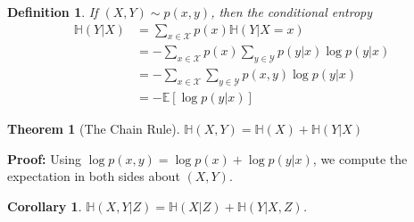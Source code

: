 \documentclass[11pt]{article}
\newtheorem{theorem}{Theorem}[section]
\newtheorem{definition}{Definition}[section]
\newtheorem{corollary}{Corollary}[section]
\begin{document}
\begin{definition}
If $(X,Y)\sim p(x,y)$, then the conditional entropy
\[
\begin{split}
\mathbb{H}(Y|X) &= \sum\limits_{x \in \mathcal{X}}p(x)\mathbb{H}(Y|X=x) \\
                &=-\sum\limits_{x \in \mathcal{X}}p(x)\sum\limits_{y \in \mathcal{Y}}p(y|x)\log p(y|x)\\
                &=-\sum\limits_{x \in \mathcal{X}}\sum\limits_{y \in \mathcal{Y}}p(x,y)\log p(y|x)\\
                &=-\mathbb{E}\left[\log p(y|x)\right]
\end{split}
\]
\end{definition}
\begin{theorem}[The Chain Rule]
$\mathbb{H}(X,Y)=\mathbb{H}(X)+\mathbb{H}(Y|X)$
\end{theorem}
{\bf Proof:}
Using $\log p(x,y)=\log p(x) + \log p(y|x)$, we compute the expectation in both sides about $(X,Y)$.

\begin{corollary}
$\mathbb{H}(X,Y|Z)=\mathbb{H}(X|Z)+\mathbb{H}(Y|X,Z)$.
\end{corollary}
\end{document}
